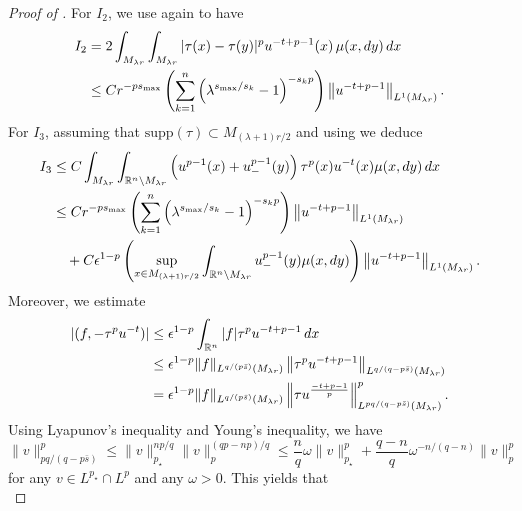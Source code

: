 \documentclass[11pt]{amsart}
\theoremstyle{plain}
\theoremstyle{definition}
\numberwithin{equation}{section}
\renewcommand{\d}{\textnormal{d}}
\newcommand{\R}{\mathbb{R}}
\begin{document}
\begin{proof} [Proof of ]
For $I_2$, we use  again to have
\begin{equation*}
\begin{split}
I_2
&= 2\int_{M_{\lambda r}} \int_{M_{\lambda r}} |\tau(x)-\tau(y)|^p u^{-t+p-1}(x) \,\mu(x, \d y)\, \d x \\
&\leq C r^{-ps_{\max}}\left( \sum_{k=1}^n \left( \lambda^{s_{\max}/s_k}-1 \right)^{-s_k p} \right) \left\|u^{-t+p-1}\right\|_{L^1(M_{\lambda r})}.
\end{split}
\end{equation*}
For $I_3$, assuming that $\mathrm{supp}(\tau) \subset M_{(\lambda+1)r/2}$ and using  we deduce
\begin{equation*}
\begin{split}
I_3
&\leq C \int_{M_{\lambda r}} \int_{\mathbb{R}^n \setminus M_{\lambda r}} \left( u^{p-1}(x)+u_-^{p-1}(y) \right) \tau^p(x) u^{-t}(x) \mu(x, \d y)\, \d x \\
&\leq C r^{-ps_{\max}}\left( \sum_{k=1}^n \left( \lambda^{s_{\max}/s_k}-1 \right)^{-s_k p} \right) \left\|u^{-t+p-1}\right\|_{L^1(M_{\lambda r})} \\
&\quad + C\epsilon^{1-p} \left( \sup_{x \in M_{(\lambda+1)r/2}} \int_{\mathbb{R}^n \setminus M_{\lambda r}} u_-^{p-1}(y) \mu(x, \d y) \right) \left\|u^{-t+p-1}\right\|_{L^1(M_{\lambda r})}.
\end{split}
\end{equation*}
Moreover, we estimate
\begin{equation*}
\begin{split}
|(f, -\tau^p u^{-t})|
&\leq \epsilon^{1-p} \int_{\R^n} |f| \tau^p u^{-t+p-1} \,\d x \\
&\leq \epsilon^{1-p} \|f\|_{L^{q/(p\bar{s})}(M_{\lambda r})} \left\| \tau^p u^{-t+p-1} \right\|_{L^{q/(q-p\bar{s})}(M_{\lambda r})} \\
&= \epsilon^{1-p} \|f\|_{L^{q/(p\bar{s})}(M_{\lambda r})} \left\| \tau u^{\frac{-t+p-1}{p}} \right\|_{L^{pq/(q-p\bar{s})}(M_{\lambda r})}^p.
\end{split}
\end{equation*}
Using Lyapunov's inequality and Young's inequality, we have
\begin{equation*}
\|v\|_{pq/(q-p\bar{s})}^p \leq \|v\|_{p_\star}^{np/q} \|v\|_p^{(qp-np)/q} \leq \frac{n}{q} \omega \|v\|_{p_{\star}}^p + \frac{q-n}{q} \omega^{-n/(q-n)} \|v\|_p^p
\end{equation*}
for any $v \in L^{p_{\star}} \cap L^p$ and any $\omega > 0$. This yields that
\begin{equation*}

\end{equation*}
\end{proof}
\end{document}
